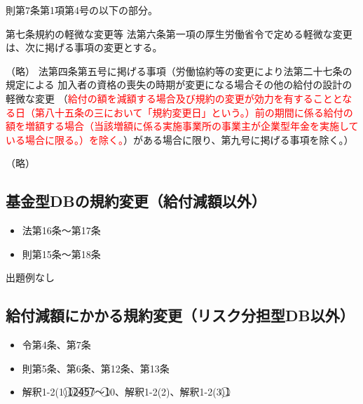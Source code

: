 \begin{explanationbox}
  則第7条第1項第4号の以下の部分。

  \begin{lawstructure}
    \begin{lawarticle}{第七条}{規約の軽微な変更等}
      法第六条第一項の厚生労働省令で定める軽微な変更は、次に掲げる事項の変更とする。
      
      （略）
      法第四条第五号に掲げる事項（労働協約等の変更により法第二十七条の規定による
      加入者の資格の喪失の時期が変更になる場合その他の給付の設計の軽微な変更
      （\textcolor{red}{給付の額を減額する場合及び規約の変更が効力を有することとなる日（第八十五条の三において「規約変更日」という。）前の期間に係る給付の額を増額する場合（当該増額に係る実施事業所の事業主が企業型年金を実施している場合に限る。）を除く。}）がある場合に限り、第九号に掲げる事項を除く。）
      
      （略）
    \end{lawarticle}
  \end{lawstructure}
\end{explanationbox}

\newpage

\subsection{基金型DBの規約変更（給付減額以外）}


\begin{InyouJobunbox}
  \begin{itemize}
    \item 法第16条〜第17条
    \item 則第15条〜第18条
  \end{itemize}
\end{InyouJobunbox}

出題例なし

\newpage

\subsection{給付減額にかかる規約変更（リスク分担型DB以外）}

\begin{InyouJobunbox}
  \begin{itemize}
    \item 令第4条、第7条
    \item 則第5条、第6条、第12条、第13条
    \item 解釈1-2(1)\textcircled{1}\textcircled{2}\textcircled{4}\textcircled{5}\textcircled{7}〜\textcircled{10}、解釈1-2(2)、解釈1-2(3)\textcircled{1}
  \end{itemize}
\end{InyouJobunbox}


